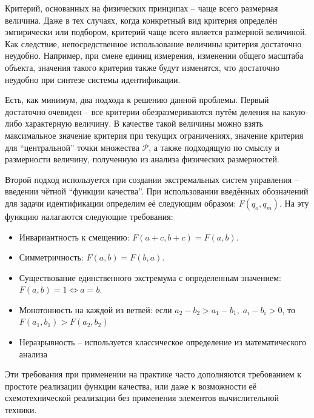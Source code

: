 Критерий, основанных на физических принципах -- чаще всего размерная
величина. Даже в тех случаях, когда конкретный вид критерия определён эмпирически
или подбором, критерий чаще всего является размерной величиной.
Как следствие, непосредственное использование величины критерия
достаточно неудобно. Например, при смене единиц измерения,
изменении общего масштаба объекта, значения такого критерия также будут
изменятся, что достаточно неудобно при синтезе системы идентификации.

Есть, как минимум, два подхода к решению данной проблемы.
Первый достаточно очевиден -- все критерии обезразмериваются путём деления
на какую-либо характерную величину. В качестве такой величины
можно взять максимальное значение критерия при текущих ограничениях,
значение критерия для ``центральной'' точки множества $\mathcal{P}$,
а также подходящую по смыслу и размерности величину, полученную
из анализа физических размерностей.

Второй подход используется при создании экстремальных систем управления
-- введении чётной ``функции качества''.
При использовании введённых обозначений для задачи идентификации
определим её следующим образом:
$F(q_o, q_m)$.
На эту функцию налагаются следующие требования:

\begin{itemize}

  \item
    Инвариантность к смещению:
    $F(a+c,b+c) = F(a,b)$.

  \item
    Симметричность: $ F(a,b) = F(b,a)$.

  \item
    Существование единственного экстремума с определенным значением:
    $F(a,b) = 1  \Leftrightarrow a = b $.

  \item
    Монотонность на каждой из ветвей:
    если $ a_2-b_2 > a_1-b_1, \; a_i-b_i > 0$, то $F(a_1,b_1) > F(a_2,b_2)$

  \item
    Неразрывность -- используется классическое определение из математического анализа

\end{itemize}

Эти требования при применении на практике часто дополняются
требованием к простоте реализации функции качества,
или даже к возможности её схемотехнической реализации
без применения элементов вычислительной техники.



